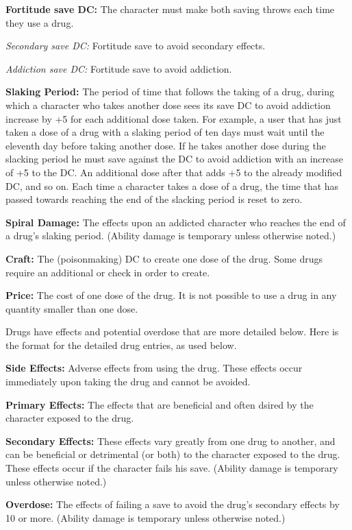 \textbf{Fortitude save DC:} The character must make both saving throws each time they use a drug.

\textit{Secondary save DC:} Fortitude save to avoid secondary effects. 

\textit{Addiction save DC:} Fortitude save to avoid addiction.

\textbf{Slaking Period:} The period of time that follows the taking of a drug, during which a character who takes another dose sees its save DC to avoid addiction increase by +5 for each additional dose taken. For example, a user that has just taken a dose of a drug with a slaking period of ten days must wait until the eleventh day before taking another dose. If he takes another dose during the slacking period he must save against the DC to avoid addiction with an increase of +5 to the DC. An additional dose after that adds +5 to the already modified DC, and so on. Each time a character takes a dose of a drug, the time that has passed towards reaching the end of the slacking period is reset to zero.

\textbf{Spiral Damage:} The effects upon an addicted character who reaches the end of a drug's slaking period. (Ability damage is temporary unless otherwise noted.)

\textbf{Craft:} The  (poisonmaking) DC to create one dose of the drug. Some drugs require an additional  or  check in order to create.

\textbf{Price:} The cost of one dose of the drug. It is not possible to use a drug in any quantity smaller than one dose.

Drugs have effects and potential overdose that are more detailed below. Here is the format for the detailed drug entries, as used below.

\textbf{Side Effects:} Adverse effects from using the drug. These effects occur immediately upon taking the drug and cannot be avoided.

\textbf{Primary Effects:} The effects that are beneficial and often dsired by the character exposed to the drug.

\textbf{Secondary Effects:} These effects vary greatly from one drug to another, and can be beneficial or detrimental (or both) to the character exposed to the drug. These effects occur if the character fails his save. (Ability damage is temporary unless otherwise noted.)

\textbf{Overdose:} The effects of failing a save to avoid the drug's secondary effects by 10 or more. (Ability damage is temporary unless otherwise noted.)


